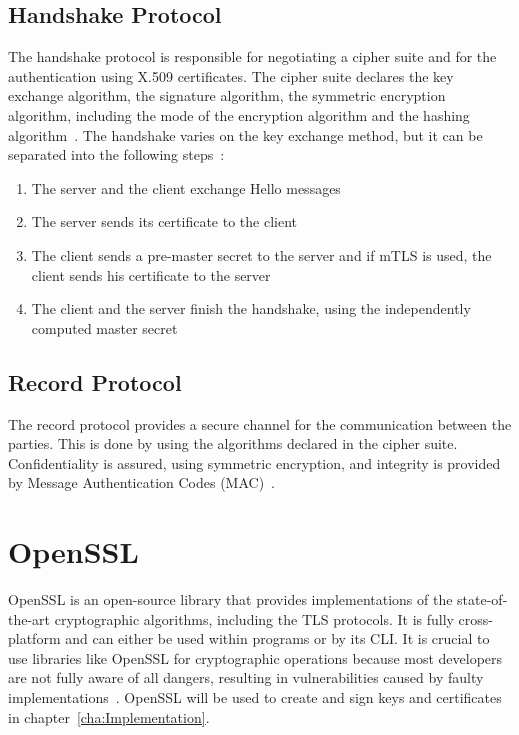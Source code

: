 \pagebreak

\subsection{Handshake Protocol}
The handshake protocol is responsible for negotiating a cipher suite and for the authentication using X.509 certificates.
The cipher suite declares the key exchange algorithm, the signature algorithm, the symmetric encryption algorithm, including the mode of the encryption algorithm and the hashing algorithm~\cite{turnertls, kurbatov2021design}.
The handshake varies on the key exchange method, but it can be separated into the following steps~\cite{krawczyk2013security}:
\begin{enumerate}
    \item The server and the client exchange Hello messages
    \item The server sends its certificate to the client
    \item The client sends a pre-master secret to the server and if mTLS is used, the client sends his certificate to the server
    \item The client and the server finish the handshake, using the independently computed master secret
\end{enumerate}

\subsection{Record Protocol}
The record protocol provides a secure channel for the communication between the parties.
This is done by using the algorithms declared in the cipher suite.
Confidentiality is assured, using symmetric encryption, and integrity is provided by Message Authentication Codes (MAC)~\cite{kurbatov2021design, krawczyk2013security}.

\section{OpenSSL}
OpenSSL is an open-source library that provides implementations of the state-of-the-art cryptographic algorithms, including the TLS protocols.
It is fully cross-platform and can either be used within programs or by its CLI.
It is crucial to use libraries like OpenSSL for cryptographic operations because most developers are not fully aware of all dangers, resulting in vulnerabilities caused by faulty implementations~\cite{viega2002network}.
OpenSSL will be used to create and sign keys and certificates in chapter~\ref{cha:Implementation}.


